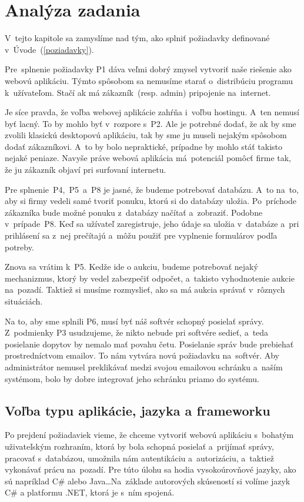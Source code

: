 \chapter{Analýza zadania}

V~tejto kapitole sa zamyslíme nad tým, ako splniť požiadavky definované v~Úvode~(\ref{poziadavky}).

Pre~splnenie požiadavky P1 dáva veľmi dobrý zmysel vytvoriť naše riešenie ako webovú aplikáciu. Týmto spôsobom sa nemusíme starať o~distribúciu programu k~užívateľom. Stačí ak má zákazník~(resp. admin) pripojenie na~internet.

Je síce pravda, že voľba webovej aplikácie zahŕňa i~voľbu hostingu. A~ten nemusí byť lacný. To by mohlo byť v~rozpore s~P2. Ale je potrebné dodať, že ak by sme zvolili klasickú desktopovú aplikáciu, tak by sme ju museli nejakým spôsobom dodať zákazníkovi. A~to by bolo nepraktické, prípadne by mohlo stáť takisto nejaké peniaze. Navyše práve webová aplikácia má~potenciál pomôcť firme tak, že ju zákazník objaví pri surfovaní internetu.

Pre splnenie~P4,~P5~a~P8 je jasné, že budeme potrebovať databázu. A~to na~to, aby si firmy vedeli samé tvoriť ponuku, ktorú si do databázy uložia. Po~príchode zákazníka bude možné ponuku z~databázy načítať a~zobraziť. Podobne v~prípade~P8. Keď sa užívateľ zaregistruje, jeho údaje sa uložia v~databáze a~pri prihlásení sa z~nej prečítajú a~môžu použiť pre vyplnenie formulárov podľa potreby.

Znova sa vrátim k~P5. Kedže ide o aukciu, budeme potrebovať nejaký mechanizmus, ktorý by vedel zabezpečiť odpočet, a~takisto vyhodnotenie aukcie na~pozadí. Taktiež si musíme rozmyslieť, ako sa má aukcia správať v~rôznych situáciách.

Na to, aby sme splnili P6, musí byť náš softvér schopný posielať správy. Z~podmienky P3 usudzujeme, že nikto nebude pri softvére sedieť, a~teda posielanie dopytov by nemalo mať povahu četu. Posielanie správ bude prebiehať prostredníctvom emailov. To nám vytvára novú požiadavku na~softvér. Aby administrátor nemusel preklikávať medzi svojou emailovou schránku a~naším systémom, bolo by dobre integrovať jeho schránku priamo do systému.

\section{Voľba typu aplikácie, jazyka a frameworku}

Po prejdení požiadaviek vieme, že chceme vytvoriť webovú aplikáciu s~bohatým uživateľským rozhraním, ktorá by bola schopná posielať a~prijímať správy, pracovať s~databázou, umožnila nám autentikáciu a~autorizáciu, a~taktiež vykonávať prácu na~pozadí. Pre túto úlohu sa hodia vysokoúrovňové jazyky, ako sú napríklad C\# alebo Java\dots Na~základe autorových skúseností si volíme jazyk C\# a platformu .NET, ktorá je s~ním spojená.

